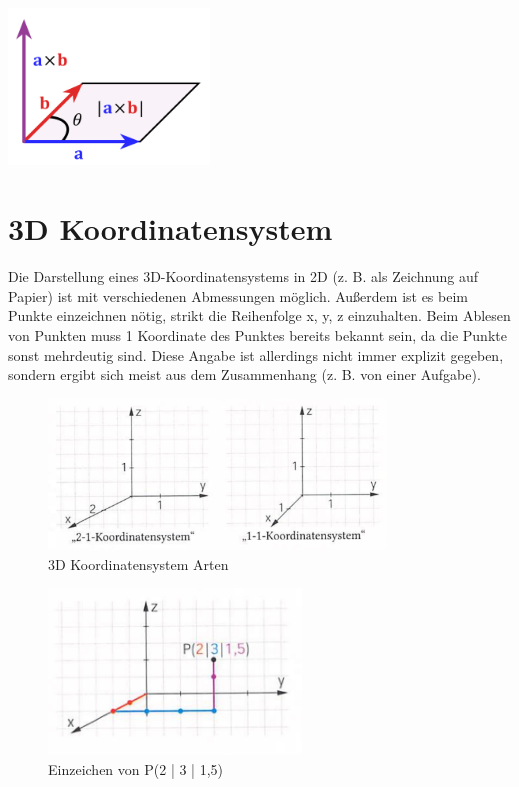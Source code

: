 \includegraphics[width=0.4\textwidth]{images/cross-p.png}

\clearpage

\section{3D Koordinatensystem}

Die Darstellung eines 3D-Koordinatensystems in 2D (z. B. als Zeichnung auf Papier)
ist mit verschiedenen Abmessungen möglich. Außerdem ist es beim Punkte einzeichnen nötig,
strikt die Reihenfolge x, y, z einzuhalten.
Beim Ablesen von Punkten muss 1 Koordinate des Punktes bereits bekannt sein, da die Punkte
sonst mehrdeutig sind. Diese Angabe ist allerdings nicht immer explizit gegeben,
sondern ergibt sich meist aus dem Zusammenhang (z. B. von einer Aufgabe).

\begin{figure}[H]
    \includegraphics[width=0.8\textwidth]{images/3d-cord-systems.png}
    \caption{3D Koordinatensystem Arten}
\end{figure}

\begin{figure}[H]
    \includegraphics[width=0.6\textwidth]{images/3d-draw-point.png}
    \caption{Einzeichen von P(2 | 3 | 1,5)}
\end{figure}

